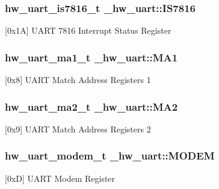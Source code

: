 \subsubsection[{\texorpdfstring{I\+S7816}{IS7816}}]{ {\bf hw\+\_\+uart\+\_\+is7816\+\_\+t} \+\_\+hw\+\_\+uart\+::\+I\+S7816}\hypertarget{struct__hw__uart_abd9a021457e1dbcf539bc4bcf82b77d8}{}\label{struct__hw__uart_abd9a021457e1dbcf539bc4bcf82b77d8}
\mbox{[}0x1A\mbox{]} U\+A\+RT 7816 Interrupt Status Register 
\subsubsection[{\texorpdfstring{M\+A1}{MA1}}]{ {\bf hw\+\_\+uart\+\_\+ma1\+\_\+t} \+\_\+hw\+\_\+uart\+::\+M\+A1}\hypertarget{struct__hw__uart_abd2b52dfaca91f45765d932140881777}{}\label{struct__hw__uart_abd2b52dfaca91f45765d932140881777}
\mbox{[}0x8\mbox{]} U\+A\+RT Match Address Registers 1 
\subsubsection[{\texorpdfstring{M\+A2}{MA2}}]{ {\bf hw\+\_\+uart\+\_\+ma2\+\_\+t} \+\_\+hw\+\_\+uart\+::\+M\+A2}\hypertarget{struct__hw__uart_a20bfdde45e1ccf56a5e7699635f979cf}{}\label{struct__hw__uart_a20bfdde45e1ccf56a5e7699635f979cf}
\mbox{[}0x9\mbox{]} U\+A\+RT Match Address Registers 2 
\subsubsection[{\texorpdfstring{M\+O\+D\+EM}{MODEM}}]{ {\bf hw\+\_\+uart\+\_\+modem\+\_\+t} \+\_\+hw\+\_\+uart\+::\+M\+O\+D\+EM}\hypertarget{struct__hw__uart_a249ce9ae96afec2eb08bd1b5eba63fde}{}\label{struct__hw__uart_a249ce9ae96afec2eb08bd1b5eba63fde}
\mbox{[}0xD\mbox{]} U\+A\+RT Modem Register 
